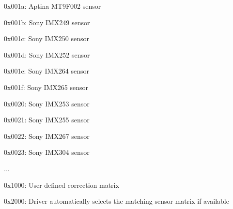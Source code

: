 \begin{DoxyItemize}
\item 0x001a\+: Aptina M\+T9\+F002 sensor
\item 0x001b\+: Sony I\+M\+X249 sensor
\item 0x001c\+: Sony I\+M\+X250 sensor
\item 0x001d\+: Sony I\+M\+X252 sensor
\item 0x001e\+: Sony I\+M\+X264 sensor
\item 0x001f\+: Sony I\+M\+X265 sensor
\item 0x0020\+: Sony I\+M\+X253 sensor
\item 0x0021\+: Sony I\+M\+X255 sensor
\item 0x0022\+: Sony I\+M\+X267 sensor
\item 0x0023\+: Sony I\+M\+X304 sensor
\item ...
\item 0x1000\+: User defined correction matrix
\item 0x2000\+: Driver automatically selects the matching sensor matrix if available
\end{DoxyItemize}

